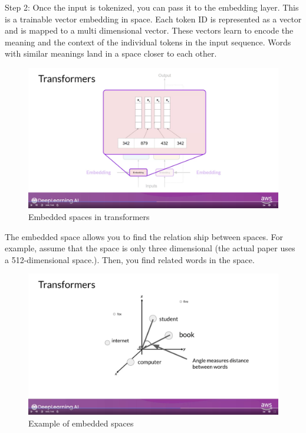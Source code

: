\documentclass[12pt]{report}
\begin{document}
Step 2:
Once the input is tokenized, you can pass it to the embedding layer. This is a trainable vector embedding in space. Each token ID is represented as a vector and is mapped to a multi dimensional vector. These vectors learn to encode the meaning and the context of the individual tokens in the input sequence. Words with similar meanings land in a space closer to each other.

\begin{figure}[H]
  \centering
  \caption{Embedded spaces in transformers}
  \includegraphics[trim=3cm 7cm 5cm 0cm,clip,scale=0.15]{pics/embeddedSpace.png}
\end{figure}

The embedded space allows you to find the relation ship between spaces. For example, assume that the space is only three dimensional (the actual paper uses a 512-dimensional space.). Then, you find related words in the space.


\begin{figure}[H]
  \centering
  \caption{Example of embedded spaces}
  \includegraphics[trim=3cm 7cm 5cm 0cm,clip,scale=0.15]{pics/exEmbedSpace.png}
\end{figure}
\end{document}
